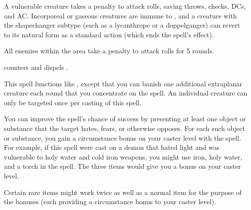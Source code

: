 \begin{spellnotes}
  A vulnerable creature takes a  penalty to attack rolls, saving throws, checks, DCs, and AC.
  Incorporeal or gaseous creatures are immune to , and a creature with the shapechanger subtype (such as a lycanthrope or a doppelganger) can revert to its natural form as a standard action (which ends the spell's effect). 
\end{spellnotes}

\begin{spelleffect}
  All enemies within the area take a  penalty to attack rolls for 5 rounds.
\end{spelleffect}
\begin{spellnotes}
   counters and dispels .
\end{spellnotes}

\spellrng{\rngmed}
\begin{spelleffect}
  This spell functions like , except that you can banish one additional extraplanar creature each round that you concentrate on the spell. An individual creature can only be targeted once per casting of this spell.
\end{spelleffect}
\begin{spellnotes}
  You can improve the spell's chance of success by presenting at least one object or substance that the target hates, fears, or otherwise opposes. For each such object or substance, you gain a  circumstance bonus on your caster level with the spell. For example, if this spell were cast on a demon that hated light and was vulnerable to holy water and cold iron weapons, you might use iron, holy water, and a torch in the spell. The three items would give you a  bonus on your caster level. 
  \par Certain rare items might work twice as well as a normal item for the purpose of the bonuses (each providing a  circumstance bonus to your caster level).
\end{spellnotes}

